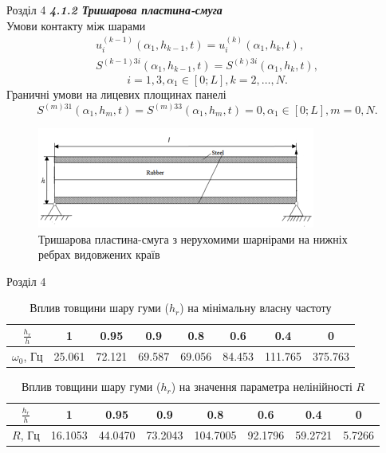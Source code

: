 \documentclass[8pt]{beamer}
\numberwithin{figure}{section}
\numberwithin{equation}{section}
\numberwithin{table}{section}
\begin{document}
\begin{frame}{Розділ 4}
\textbf{\textit{4.1.2 Тришарова пластина-смуга}}
\\
Умови контакту між шарами
\begin{gather}
u_i^{(k-1)}\left(\alpha_1, h_{k-1},t \right)=u_i^{(k)}\left(\alpha_1, h_{k},t \right),\\
S^{(k-1)3i}\left(\alpha_1, h_{k-1},t \right)=S^{(k)3i}\left(\alpha_1, h_{k},t \right),
\end{gather}
\[ i=1,3, \alpha_1 \in [0;L], k=2,\dots,N.\]
Граничні умови на лицевих площинах панелі
\begin{equation}
S^{(m)31}\left(\alpha_1, h_{m},t \right)=S^{(m)33}\left(\alpha_1, h_{m},t \right)=0,\alpha_1 \in [0;L], m=0,N.
\end{equation}

\begin{figure}
	\includegraphics[scale=0.5]{pic/plate3layers.png}
		\caption{Тришарова пластина-смуга з нерухомими шарнірами на нижніх ребрах видовжених країв}
		\label{fig:AFR_H}
\end{figure}


\end{frame}


\begin{frame}{Розділ 4}
\begin{table}[h!]
\centering
 \begin{tabular}{| c | c | c | c | c | c | c | c |} 
 \hline
 $\displaystyle \frac{h_{r}}{h}$ & 1 & 0.95 & 0.9 & 0.8 & 0.6 & 0.4 & 0 \\ 
  \hline
 $\omega_0$, Гц & 25.061 & 72.121 & 69.587 & 69.056 & 84.453 & 111.765 & 375.763 \\
   \hline
\end{tabular}
\caption{Вплив товщини шару гуми ($h_{r}$) на мінімальну власну частоту}
\label{table:2}
\end{table}

\begin{table}[h!]
\centering
 \begin{tabular}{| c | c | c | c | c | c | c | c |} 
 \hline
 $\displaystyle \frac{h_{r}}{h}$ & 1 & 0.95 & 0.9 & 0.8 & 0.6 & 0.4 & 0 \\ 
  \hline
 $R$, Гц & 16.1053 & 44.0470 & 73.2043 & 104.7005 & 92.1796 & 59.2721 & 5.7266 \\
   \hline
\end{tabular}
\caption{Вплив товщини шару гуми ($h_{r}$) на значення параметра нелінійності $R$}
\label{table:3}
\end{table}

\end{frame}
\end{document}
